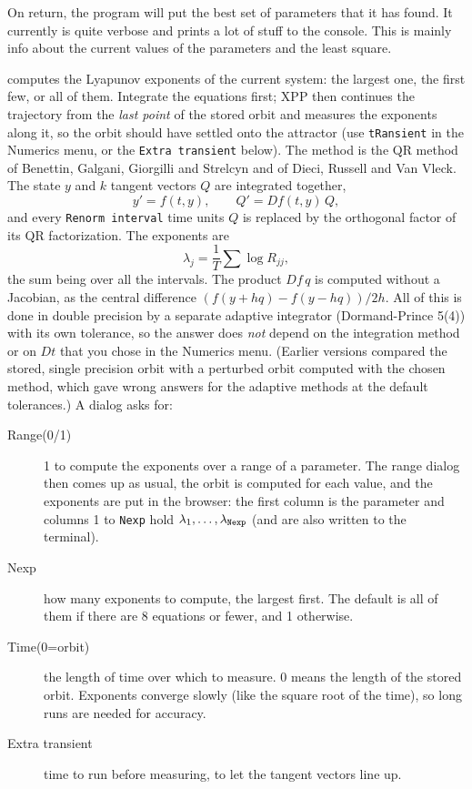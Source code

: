 \documentclass{article}
\newcommand{\tcc}[1]{\addcontentsline{toc}{subsubsection}{#1}}
\begin{document}
\begin{description}
\begin{description}
On return, the program will put the best set of parameters that it has
found.  It currently is quite verbose and prints a lot of stuff to the
console.  This is mainly info about the current values of the
parameters and the least square.
\tcc{Liapunov exponent}\item[Liapunov] computes the Lyapunov exponents of the current
system: the largest one, the first few, or all of them.  Integrate the equations first; XPP then continues the
trajectory from the {\em last point} of the stored orbit and measures the exponents along it, so the orbit should
have settled onto the attractor (use {\tt tRansient} in the Numerics menu, or the {\tt Extra transient} below).
The method is the QR method of Benettin, Galgani, Giorgilli and Strelcyn and of Dieci, Russell and Van Vleck.  The state $y$
and $k$ tangent vectors $Q$ are integrated together,
\[
y' = f(t,y), \qquad Q' = Df(t,y)\,Q,
\]
and every {\tt Renorm interval} time units $Q$ is replaced by the orthogonal factor of its QR factorization.  The exponents are
\[
\lambda_j = \frac{1}{T}\sum \log R_{jj},
\]
the sum being over all the intervals.  The product $Df\,q$ is computed without a Jacobian, as the central difference
$(f(y+hq)-f(y-hq))/2h.$  All of this is done in double precision by a separate adaptive integrator
(Dormand-Prince 5(4)) with its own tolerance, so the answer does {\em not} depend on the integration method or on $Dt$
that you chose in the Numerics menu.  (Earlier versions compared the stored, single precision orbit with a
perturbed orbit computed with the chosen method, which gave wrong answers for the adaptive methods at the
default tolerances.)  A dialog asks for:
\begin{description}
\item[Range(0/1)] 1 to compute the exponents over a range of a parameter.  The range dialog then comes up as usual, the orbit is
computed for each value, and the exponents are put in the browser: the first column is the parameter and
columns 1 to {\tt Nexp} hold $\lambda_1,\ldots,\lambda_{\tt Nexp}$ (and are also written to the terminal).
\item[Nexp] how many exponents to compute, the largest first.  The default is all of them if there are 8 equations or fewer, and 1 otherwise.
\item[Time(0=orbit)] the length of time over which to measure.  0 means the length of the stored orbit.
Exponents converge slowly (like the square root of the time), so long runs are needed for accuracy.
\item[Extra transient] time to run before measuring, to let the tangent vectors line up.

\end{description}
\end{description}
\end{description}
\end{document}
